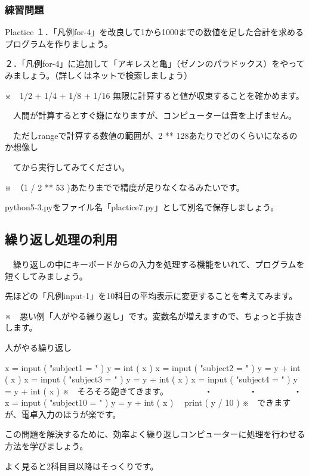 \documentclass[11pt,a4paper,dvipdfmx,titlepage]{jsreport}
\begin{document}
\subsubsection{練習問題}
\begin{plabox}{Plactice}
１．「凡例for-4」を改良して1から1000までの数値を足した合計を求めるプログラムを作りましょう。

２．「凡例for-4」に追加して「アキレスと亀」（ゼノンのパラドックス）をやってみましょう。（詳しくはネットで検索しましょう）

※　1/2 + 1/4 + 1/8 + 1/16 無限に計算すると値が収束することを確かめます。

　人間が計算するとすぐ嫌になりますが、コンピューターは音を上げません。

　ただしrangeで計算する数値の範囲が、2 ** 128あたりでどのくらいになるのか想像し

　てから実行してみてください。

※　（1 / 2 ** 53 )あたりまでで精度が足りなくなるみたいです。

python5-3.pyをファイル名「plactice7.py」として別名で保存しましょう。


\end{plabox}

\subsection{繰り返し処理の利用}
　繰り返しの中にキーボードからの入力を処理する機能をいれて、プログラムを短くしてみましょう。

先ほどの「凡例input-1」を10科目の平均表示に変更することを考えてみます。

※　悪い例「人がやる繰り返し」です。変数名が増えますので、ちょっと手抜きします。
\newpage
\begin{grabox}{人がやる繰り返し}
\begin{listing}{1}
x = input ( "subject1 = " )
y = int ( x ) 
x = input ( "subject2 = " )
y = y + int ( x ) 
x = input ( "subject3 = " )
y = y + int ( x ) 
x = input ( "subject4 = " )
y = y + int ( x ) 
※　そろそろ飽きてきます。
　　　　・
　　　　・
　　　　・
x = input ( "subject10 = " )
y = y + int ( x )　
print ( y / 10 )
※　できますが、電卓入力のほうが楽です。
\end{listing}
\end{grabox}

この問題を解決するために、効率よく繰り返しコンピューターに処理を行わせる方法を学びましょう。

よく見ると2科目目以降はそっくりです。
\end{document}
